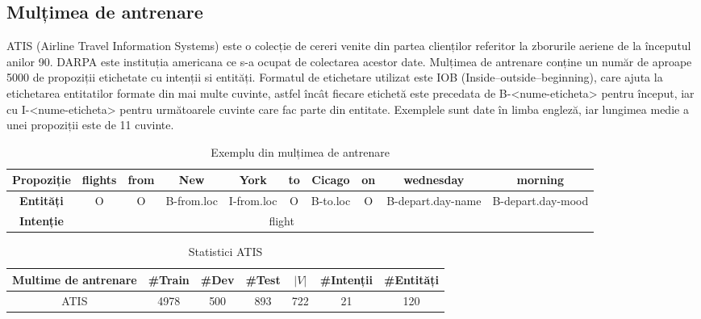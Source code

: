 \subsection{Mulțimea de antrenare}
ATIS (Airline Travel Information Systems) \cite{atis} este o colecție de cereri venite din partea clienților referitor la zborurile aeriene de la începutul anilor 90. DARPA este instituția americana ce s-a ocupat de colectarea acestor date. Mulțimea de antrenare conține un număr de aproape 5000 de propoziții etichetate cu intenții si entități. Formatul de etichetare utilizat este IOB (Inside–outside–beginning), care ajuta la etichetarea entitatilor formate din mai multe cuvinte, astfel încât fiecare etichetă este precedata de B-<nume-eticheta> pentru început, iar cu I-<nume-eticheta> pentru următoarele cuvinte care fac parte din entitate. Exemplele sunt date în limba engleză, iar lungimea medie a unei propoziții este de 11 cuvinte.

\begin{table}[h]
	\centering
	\caption{Exemplu din mulțimea de antrenare}
	\label{atis_example}
	\begin{adjustbox}{max width=\textwidth}
		\begin{tabular}{ |c|c|c|c|c|c|c|c|c|c| } 
			\hline
			\textbf{Propoziție} & flights & from & New & York & to & Cicago & on & wednesday & morning \\ 
			\hline
			\textbf{Entități} & O & O & B-from.loc & I-from.loc & O & B-to.loc & O & B-depart.day-name & B-depart.day-mood \\
			\hline
			\textbf{Intenție} & \multicolumn{8}{c}{flight} &  \\ 
			\hline
		\end{tabular}
	\end{adjustbox}
\end{table}

\begin{table}[h]
	\centering
	\caption{Statistici ATIS}
	\label{atis_stats}
	\begin{adjustbox}{max width=\textwidth}
		\begin{tabular}{ |c|c|c|c|c|c|c| } 
			\hline
			\textbf{Multime de antrenare} & \#Train & \#Dev & \#Test & $|V|$ & \#Intenții & \#Entități \\ 
			\hline
			ATIS & 4978 & 500 & 893 & 722 & 21 & 120 \\
			\hline
		\end{tabular}
	\end{adjustbox}
\end{table}


